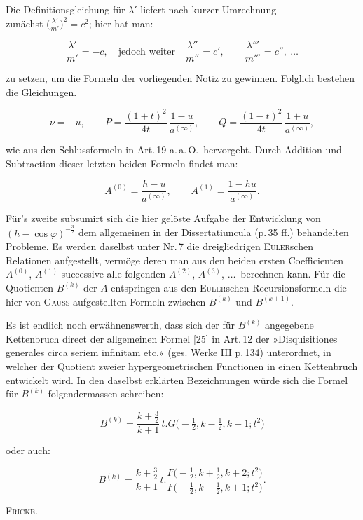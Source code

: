 %
\noindent Die Definitionsgleichung für $\lambda'$ liefert nach kurzer Umrechnung\hfill\\
zunächst \mbox{$\bigl(\frac{\lambda'}{m'}\bigr)^{2}=c^{2}$}; hier hat man:

\[
\frac{\lambda'}{m'}=-c,\quad\text{jedoch weiter}\quad
\frac{\lambda''}{m''}=c',\qquad \frac{\lambda'''}{m'''}=c'',\ \ldots
\]

\noindent zu setzen, um die Formeln der vorliegenden Notiz zu gewinnen. Folglich bestehen die
Gleichungen.

\[
\nu=-u,\qquad P=\frac{(1+t)^{2}}{4t}\,\frac{1-u}{a^{(\infty)}},\qquad
Q=\frac{(1-t)^{2}}{4t}\,\frac{1+u}{a^{(\infty)}},
\]

\noindent wie aus den Schlussformeln in Art.\,19 a.\,a.\,O.\ hervorgeht. Durch Addition und
Subtraction dieser letzten beiden Formeln findet man:

\[
A^{(0)}=\frac{h-u}{a^{(\infty)}},\qquad A^{(1)}=\frac{1-hu}{a^{(\infty)}}.
\]

Für’s zweite subsumirt sich die hier gelöste Aufgabe der Entwicklung von
$(h-\cos\varphi)^{-\frac{3}{2}}$ dem allgemeinen in der Dissertatiuncula (p.\,35 ff.)
behandelten Probleme. Es werden daselbst unter Nr.\,7 die dreigliedrigen \textsc{Euler}schen
Relationen aufgestellt, vermöge deren man aus den beiden ersten Coefficienten
$A^{(0)}$, $A^{(1)}$ successive alle folgenden $A^{(2)}$,
$A^{(3)}$, $\ldots$\ berechnen kann. Für die Quotienten $B^{(k)}$ der
$A$ entspringen aus den \textsc{Euler}schen Recursionsformeln die hier von \textsc{Gauss} aufgestellten
Formeln zwischen $B^{(k)}$ und $B^{(k+1)}$.

Es ist endlich noch erwähnenswerth, dass sich der für $B^{(k)}$ angegebene
Kettenbruch direct der allgemeinen Formel [25] in Art.\,12 der »Disquisitiones
generales circa seriem infinitam etc.« (ges. Werke III p.\,134) unterordnet, in welcher
der Quotient zweier hypergeometrischen Functionen in einen Kettenbruch entwickelt wird.
In den daselbst erklärten Bezeichnungen würde sich die Formel für $B^{(k)}$
folgendermassen schreiben:

\[
B^{(k)}=\frac{k+\frac{3}{2}}{k+1}\,t\mathord{.} G\bigl(-\tfrac{1}{2},k-\tfrac{1}{2},k+1;t^{2}\bigr)
\]

\noindent oder auch:

\[
B^{(k)}=\frac{k+\frac{3}{2}}{k+1}\,t\mathord{.}
\frac{F\bigl(-\tfrac{1}{2},k+\tfrac{1}{2},k+2;t^{2}\bigr)}{F\bigl(-\tfrac{1}{2},k-\tfrac{1}{2},k+1;t^{2}\bigr)}.
\]

\begin{flushright}
\textsc{Fricke.}
\end{flushright}
